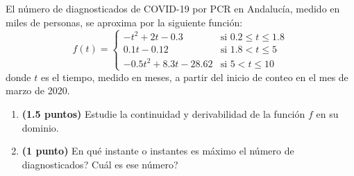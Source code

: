 
El número de diagnosticados de COVID-19 por PCR en Andalucía, medido
en miles de personas, se aproxima por la siguiente función:
\[
f(t)=\begin{cases}
-t^2+2t-0.3 & \text{si }0.2\leq t\leq 1.8\\
0.1t-0.12 & \text{si }1.8<t\leq 5\\
-0.5t^2+8.3t-28.62 & \text{si }5<t\leq 10
\end{cases}
\]
donde $t$ es el tiempo, medido en meses, a partir del inicio de conteo en
el mes de marzo de 2020.
\begin{enumerate}[label=\alph*)]
  \item \textbf{(1.5 puntos)} Estudie la continuidad y derivabilidad de la
  función $f$ en su dominio.
  \item \textbf{(1 punto)} \textquestiondown{}En qué instante o instantes
  es máximo el número de diagnosticados? \textquestiondown{}Cuál es ese número?
\end{enumerate}
